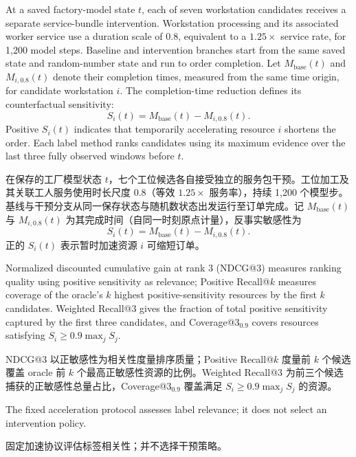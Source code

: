 \documentclass[a4paper,fleqn]{cas-dc}
\newcommand{\zhpara}[1]{%
  \par\begingroup\small\color{black!72}\noindent #1\par\endgroup}
\begin{document}
At a saved factory-model state $t$, each of seven workstation candidates receives a separate service-bundle intervention. Workstation processing and its associated worker service use a duration scale of $0.8$, equivalent to a $1.25\times$ service rate, for 1,200 model steps. Baseline and intervention branches start from the same saved state and random-number state and run to order completion. Let $M_{\mathrm{base}}(t)$ and $M_{i,0.8}(t)$ denote their completion times, measured from the same time origin, for candidate workstation $i$. The completion-time reduction defines its counterfactual sensitivity:
\begin{equation}
S_i(t)=M_{\mathrm{base}}(t)-M_{i,0.8}(t).
\end{equation}
Positive $S_i(t)$ indicates that temporarily accelerating resource $i$ shortens the order. Each label method ranks candidates using its maximum evidence over the last three fully observed windows before $t$.

\zhpara{在保存的工厂模型状态 $t$，七个工位候选各自接受独立的服务包干预。工位加工及其关联工人服务使用时长尺度 $0.8$（等效 $1.25\times$ 服务率），持续 1{,}200 个模型步。基线与干预分支从同一保存状态与随机数状态出发运行至订单完成。记 $M_{\mathrm{base}}(t)$ 与 $M_{i,0.8}(t)$ 为其完成时间（自同一时刻原点计量），反事实敏感性为
\begin{equation}
S_i(t)=M_{\mathrm{base}}(t)-M_{i,0.8}(t).
\end{equation}
正的 $S_i(t)$ 表示暂时加速资源 $i$ 可缩短订单。}


Normalized discounted cumulative gain at rank 3 (NDCG@3) measures ranking quality using positive sensitivity as relevance; Positive Recall@$k$ measures coverage of the oracle's $k$ highest positive-sensitivity resources by the first $k$ candidates. Weighted Recall@3 gives the fraction of total positive sensitivity captured by the first three candidates, and Coverage@3$_{0.9}$ covers resources satisfying $S_i\geq0.9\max_j S_j$.

\zhpara{NDCG@3 以正敏感性为相关性度量排序质量；Positive Recall@$k$ 度量前 $k$ 个候选覆盖 oracle 前 $k$ 个最高正敏感性资源的比例。Weighted Recall@3 为前三个候选捕获的正敏感性总量占比，Coverage@3$_{0.9}$ 覆盖满足 $S_i\geq0.9\max_j S_j$ 的资源。}


The fixed acceleration protocol assesses label relevance; it does not select an intervention policy.

\zhpara{固定加速协议评估标签相关性；并不选择干预策略。}
\end{document}
